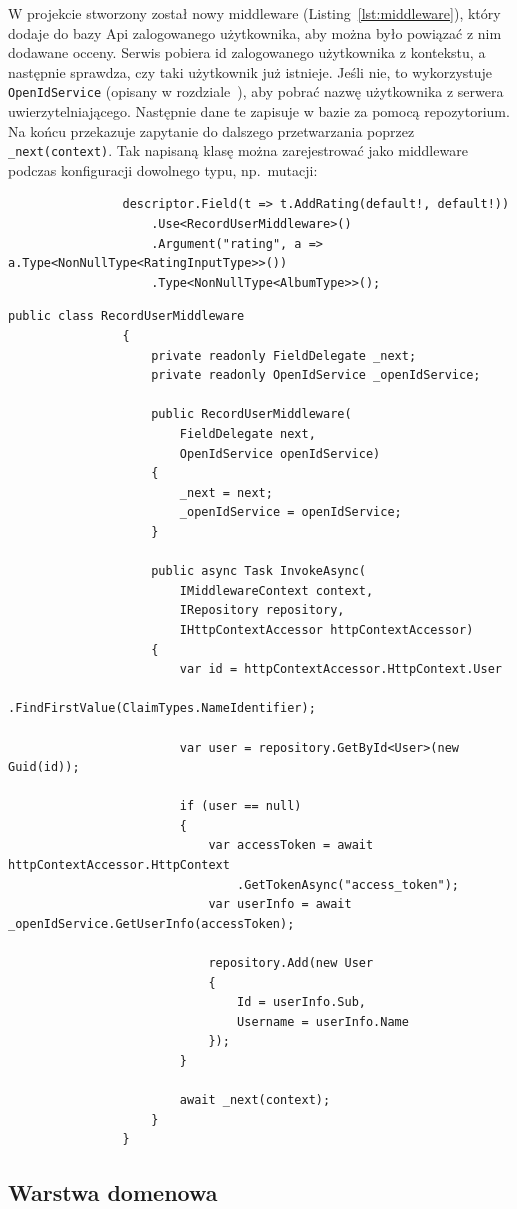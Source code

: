 			W projekcie stworzony został nowy middleware (Listing~\ref{lst:middleware}), który dodaje do bazy Api zalogowanego użytkownika, aby można było powiązać z nim dodawane occeny.
			Serwis pobiera id zalogowanego użytkownika z kontekstu, a następnie sprawdza, czy taki użytkownik już istnieje.
			Jeśli nie, to wykorzystuje \verb|OpenIdService| (opisany w rozdziale~),
			aby pobrać nazwę użytkownika z serwera uwierzytelniającego.
			Następnie dane te zapisuje w bazie za pomocą repozytorium.
			Na końcu przekazuje zapytanie do dalszego przetwarzania poprzez \verb|_next(context)|.
			Tak napisaną klasę można zarejestrować jako middleware podczas konfiguracji dowolnego typu, np.\ mutacji:
			\begin{lstlisting}
				descriptor.Field(t => t.AddRating(default!, default!))
					.Use<RecordUserMiddleware>()
					.Argument("rating", a => a.Type<NonNullType<RatingInputType>>())
					.Type<NonNullType<AlbumType>>();
			\end{lstlisting}

			\begin{lstlisting}[label=lst:middleware, caption=Middleware zapisujące użytkowników, float]
				public class RecordUserMiddleware
				{
					private readonly FieldDelegate _next;
					private readonly OpenIdService _openIdService;
			
					public RecordUserMiddleware(
						FieldDelegate next,
						OpenIdService openIdService)
					{
						_next = next;
						_openIdService = openIdService;
					}
			
					public async Task InvokeAsync(
						IMiddlewareContext context,
						IRepository repository,
						IHttpContextAccessor httpContextAccessor)
					{
						var id = httpContextAccessor.HttpContext.User
							.FindFirstValue(ClaimTypes.NameIdentifier);
			
						var user = repository.GetById<User>(new Guid(id));
			
						if (user == null)
						{
							var accessToken = await httpContextAccessor.HttpContext
								.GetTokenAsync("access_token");
							var userInfo = await _openIdService.GetUserInfo(accessToken);
			
							repository.Add(new User
							{
								Id = userInfo.Sub,
								Username = userInfo.Name
							});
						}
			
						await _next(context);
					}
				}
			\end{lstlisting}

	\subsection{Warstwa domenowa}
		


